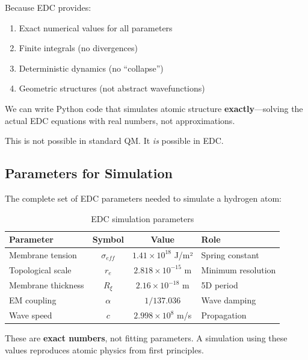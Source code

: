 \begin{tcolorbox}[colback=green!5,colframe=green!70!black,title=\textbf{The Promise of EDC Simulation}]
Because EDC provides:
\begin{enumerate}
    \item Exact numerical values for all parameters
    \item Finite integrals (no divergences)
    \item Deterministic dynamics (no ``collapse'')
    \item Geometric structures (not abstract wavefunctions)
\end{enumerate}

We can write Python code that simulates atomic structure \textbf{exactly}---solving the actual EDC equations with real numbers, not approximations.

This is not possible in standard QM. It \textit{is} possible in EDC.
\end{tcolorbox}

\subsection{Parameters for Simulation}
\label{subsec:simulation_params}

The complete set of EDC parameters needed to simulate a hydrogen atom:

\begin{table}[h]
\centering
\begin{tabular}{|l|c|c|l|}
\hline
\textbf{Parameter} & \textbf{Symbol} & \textbf{Value} & \textbf{Role} \\
\hline
Membrane tension & $\sigma_{eff}$ & $1.41 \times 10^{18}$ J/m² & Spring constant \\
Topological scale & $r_e$ & $2.818 \times 10^{-15}$ m & Minimum resolution \\
Membrane thickness & $R_\xi$ & $2.16 \times 10^{-18}$ m & 5D period \\
EM coupling & $\alpha$ & $1/137.036$ & Wave damping \\
Wave speed & $c$ & $2.998 \times 10^8$ m/s & Propagation \\
\hline
\end{tabular}
\caption{EDC simulation parameters}
\label{tab:sim_params}
\end{table}

These are \textbf{exact numbers}, not fitting parameters. A simulation using these values reproduces atomic physics from first principles.

